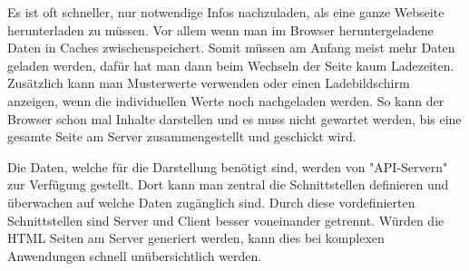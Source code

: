 Es ist oft schneller, nur notwendige Infos nachzuladen, als eine ganze Webseite herunterladen zu müssen. Vor allem wenn man im Browser heruntergeladene Daten in Caches zwischenspeichert. Somit müssen am Anfang meist mehr Daten geladen werden, dafür hat man dann beim Wechseln der Seite kaum Ladezeiten. Zusätzlich kann man Musterwerte verwenden oder einen Ladebildschirm anzeigen, wenn die individuellen Werte noch nachgeladen werden. So kann der Browser schon mal Inhalte darstellen und es muss nicht gewartet werden, bis eine gesamte Seite am Server zusammengestellt und geschickt wird.

Die Daten, welche für die Darstellung benötigt sind, werden von "API-Servern" zur Verfügung gestellt. Dort kann man zentral die Schnittstellen definieren und überwachen auf welche Daten zugänglich sind. Durch diese vordefinierten Schnittstellen sind Server und Client besser voneinander getrennt. Würden die HTML Seiten am Server generiert werden, kann dies bei komplexen Anwendungen schnell unübersichtlich werden.

